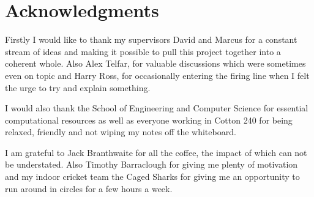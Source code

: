 \chapter*{Acknowledgments}\label{C:ack} 

Firstly I would like to thank my supervisors David and Marcus for a constant stream of ideas and making it
possible to pull this project together into a coherent whole.
Also Alex Telfar, for valuable discussions which were sometimes even on topic and
Harry Ross, for occasionally entering the firing line when I felt the urge to try and explain something.

I would also thank the School of Engineering and Computer Science for essential computational resources 
 as well as
everyone working in Cotton 240 for being relaxed, friendly and
not wiping my notes off the whiteboard.

I am grateful to Jack Branthwaite for all the coffee, the impact of which can not be understated. Also
Timothy Barraclough for giving me plenty of motivation
and my indoor cricket team the Caged Sharks for giving me an
opportunity to run around in circles for a few hours a week.
